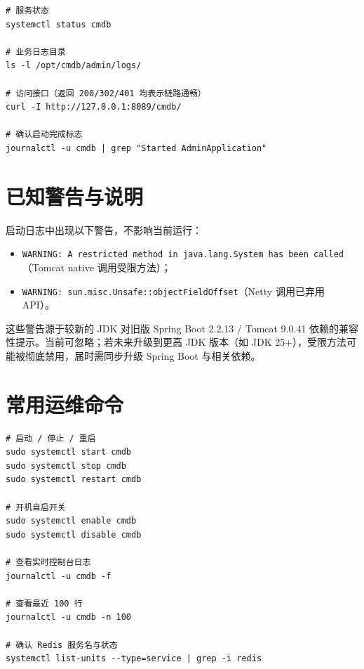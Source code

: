 \documentclass[12pt,a4paper]{ctexart}
\begin{document}
\begin{lstlisting}[style=shell]
# 服务状态
systemctl status cmdb

# 业务日志目录
ls -l /opt/cmdb/admin/logs/

# 访问接口（返回 200/302/401 均表示链路通畅）
curl -I http://127.0.0.1:8089/cmdb/

# 确认启动完成标志
journalctl -u cmdb | grep "Started AdminApplication"
\end{lstlisting}

\section{已知警告与说明}

启动日志中出现以下警告，不影响当前运行：

\begin{itemize}[leftmargin=2em]
  \item \texttt{WARNING: A restricted method in java.lang.System has been called}（Tomcat native 调用受限方法）；
  \item \texttt{WARNING: sun.misc.Unsafe::objectFieldOffset}（Netty 调用已弃用 API）。
\end{itemize}

这些警告源于较新的 JDK 对旧版 Spring Boot 2.2.13 / Tomcat 9.0.41 依赖的兼容性提示。当前可忽略；若未来升级到更高 JDK 版本（如 JDK 25+），受限方法可能被彻底禁用，届时需同步升级 Spring Boot 与相关依赖。

\section{常用运维命令}

\begin{lstlisting}[style=shell]
# 启动 / 停止 / 重启
sudo systemctl start cmdb
sudo systemctl stop cmdb
sudo systemctl restart cmdb

# 开机自启开关
sudo systemctl enable cmdb
sudo systemctl disable cmdb

# 查看实时控制台日志
journalctl -u cmdb -f

# 查看最近 100 行
journalctl -u cmdb -n 100

# 确认 Redis 服务名与状态
systemctl list-units --type=service | grep -i redis
\end{lstlisting}
\end{document}
